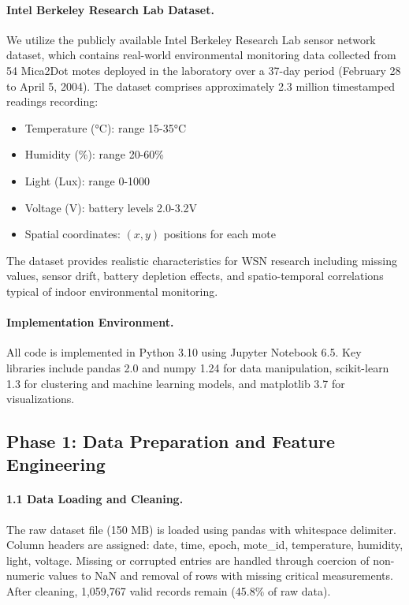 \documentclass[12pt,a4paper]{article}
\begin{document}
\paragraph{Intel Berkeley Research Lab Dataset.}
We utilize the publicly available Intel Berkeley Research Lab sensor network dataset, which contains real-world environmental monitoring data collected from 54 Mica2Dot motes deployed in the laboratory over a 37-day period (February 28 to April 5, 2004). The dataset comprises approximately 2.3 million timestamped readings recording:
\begin{itemize}
    \item Temperature (°C): range 15-35°C
    \item Humidity (\%): range 20-60\%
    \item Light (Lux): range 0-1000
    \item Voltage (V): battery levels 2.0-3.2V
    \item Spatial coordinates: $(x, y)$ positions for each mote
\end{itemize}

The dataset provides realistic characteristics for WSN research including missing values, sensor drift, battery depletion effects, and spatio-temporal correlations typical of indoor environmental monitoring.

\paragraph{Implementation Environment.}
All code is implemented in Python 3.10 using Jupyter Notebook 6.5. Key libraries include pandas 2.0 and numpy 1.24 for data manipulation, scikit-learn 1.3 for clustering and machine learning models, and matplotlib 3.7 for visualizations.

\subsection{Phase 1: Data Preparation and Feature Engineering}

\paragraph{1.1 Data Loading and Cleaning.}
The raw dataset file (150 MB) is loaded using pandas with whitespace delimiter. Column headers are assigned: date, time, epoch, mote\_id, temperature, humidity, light, voltage. Missing or corrupted entries are handled through coercion of non-numeric values to NaN and removal of rows with missing critical measurements. After cleaning, 1,059,767 valid records remain (45.8\% of raw data).
\end{document}
